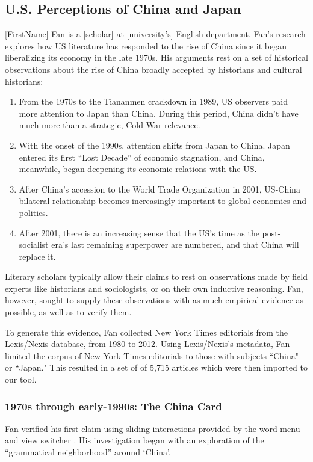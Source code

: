 \documentclass{sig-alternate}
\begin{document}
\subsection{U.S. Perceptions of China and Japan}
[FirstName] Fan is a [scholar] at [university's] English department. Fan's research explores how US literature has responded to the rise of China since it began liberalizing its economy in the late 1970s.  His arguments rest on a set of historical observations about the rise of China  broadly accepted by historians and cultural historians: 
\begin{enumerate}
\item From the 1970s to the Tiananmen crackdown in 1989, US observers paid more attention to Japan than China. During this period, China didn't have much more than a strategic, Cold War relevance. 
\item With the onset of the 1990s, attention shifts from Japan to China. Japan entered its first ``Lost Decade'' of economic stagnation, and China, meanwhile, began deepening its economic relations with the US.
\item After China's accession to the World Trade Organization in 2001, US-China bilateral relationship becomes increasingly important to global economics and politics.
\item After 2001, there is an increasing sense that the US's time as the post-socialist era's last remaining superpower are numbered, and that China will replace it.
\end{enumerate}
Literary scholars typically allow their claims to rest on observations made by field experts like historians and sociologists, or on their own inductive reasoning. Fan, however, sought to supply these observations with as much empirical evidence as possible, as well as to verify them.

To generate this evidence, Fan collected New York Times editorials from  the Lexis/Nexis database, from 1980 to 2012. Using Lexis/Nexis's metadata, Fan limited the corpus of New York Times editorials to those with subjects ``China" or ``Japan." This resulted in a set of of 5,715 articles which were then imported to our tool.

\subsubsection{1970s through early-1990s: The China Card}
Fan verified his first claim using sliding interactions provided by the word menu and view switcher . His investigation began with an exploration of the ``grammatical neighborhood'' around `China'.
\end{document}
